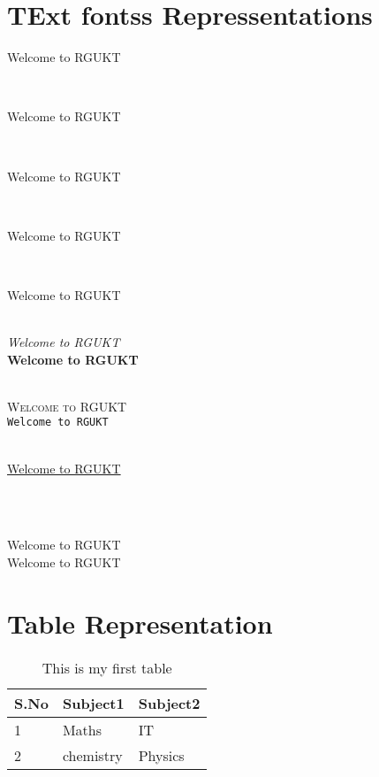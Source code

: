 \documentclass{article}
\begin{document}
\section{TExt fontss Repressentations}

\begin{tiny}
Welcome to RGUKT
\end{tiny} \\

\begin{small}
Welcome to RGUKT
\end{small} \\
\begin{large} 
Welcome to RGUKT
\end{large} \\
\begin{Large}
Welcome to RGUKT
\end{Large} \\
\begin{Huge}
Welcome to RGUKT
\end{Huge} 
\\
\textit{Welcome to RGUKT}
\\
\textbf{Welcome to RGUKT}

\\
\textsc{Welcome to RGUKT}
\\
\texttt{Welcome to RGUKT}


\\
\underline{Welcome to RGUKT}

\\
{\color{red}{Welcome to RGUKT}}
\\

\pagebreak

\huge{Welcome to RGUKT} \\
\Large{Welcome to RGUKT}

\section{Table Representation}

\begin{table}[h]
    \centering
    \begin{tabular}{|l|l|l|}
    \hline
        S.No  & Subject1 & Subject2
         \\
         \hline
         1 & Maths & IT \\
         \hline
         2 & chemistry & Physics \\
         \hline
         
    \end{tabular}
    \caption{This is my first table}
    \label{tab:my_label}
\end{table}
\end{document}
